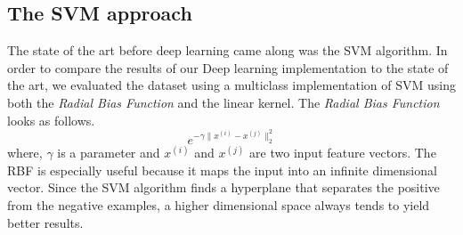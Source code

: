 \documentclass[10pt,twocolumn,letterpaper]{article}
\begin{document}
\subsection{The SVM approach}
The state of the art before deep learning came along was the SVM algorithm. In order to compare the results of our Deep learning implementation to the state of the art, we evaluated the dataset using a multiclass implementation of SVM using both the \textit{Radial Bias Function} and the linear kernel. The \textit{Radial Bias Function} looks as follows. $$e^{-\gamma\|x^{(i)}-x^{(j)}\|^2_2}$$ where, $\gamma$ is a parameter and $x^{(i)}$ and $x^{(j)}$ are two input feature vectors. The RBF is especially useful because it maps the input into an infinite dimensional vector. Since the SVM algorithm finds a hyperplane  that separates the positive from the negative examples, a higher dimensional space always tends to yield better results.\\
\end{document}
